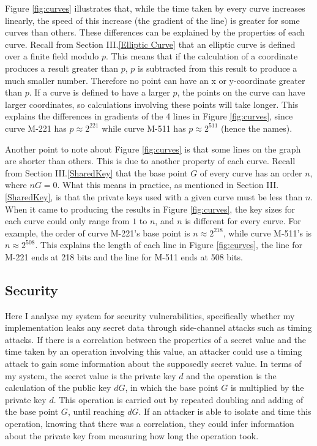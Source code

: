 \documentclass[12pt,a4paper]{article}
\begin{document}
Figure \ref{fig:curves} illustrates that, while the time taken by every curve increases linearly, 
the speed of this increase (the gradient of the line) is greater for some curves than others. 
These differences can be explained by the properties of each curve. 
Recall from Section III.\ref{Elliptic Curve} that an elliptic curve is defined over a finite field modulo $p$. 
This means that if the calculation of a coordinate produces a result greater than $p$, $p$ is subtracted from this result to produce a much smaller number. 
Therefore no point can have an x or y-coordinate greater than $p$. 
If a curve is defined to have a larger $p$, the points on the curve can have larger coordinates, 
so calculations involving these points will take longer. 
This explains the differences in gradients of the 4 lines in Figure \ref{fig:curves}, 
since curve M-221 has $p \approx 2^{221}$ while curve M-511 has $p \approx 2^{511}$ (hence the names). 

Another point to note about Figure \ref{fig:curves} is that some lines on the graph are shorter than others. 
This is due to another property of each curve. 
Recall from Section III.\ref{SharedKey} that the base point $G$ of every curve has an order $n$, where $nG=0$. 
What this means in practice, as mentioned in Section III.\ref{SharedKey}, 
is that the private keys used with a given curve must be less than $n$. 
When it came to producing the results in Figure \ref{fig:curves}, the key sizes for each curve could only range from $1$ to $n$, 
and $n$ is different for every curve. 
For example, the order of curve M-221's base point is $n \approx 2^{218}$, while curve M-511's is $n \approx 2^{508}$. 
This explains the length of each line in Figure \ref{fig:curves}, the line for M-221 ends at 218 bits and the line for M-511 ends at 508 bits. 


\subsection{Security} \noindent \label{Security}
Here I analyse my system for security vulnerabilities, 
specifically whether my implementation leaks any secret data through side-channel attacks such as timing attacks. 
If there is a correlation between the properties of a secret value and the time taken by an operation involving this value, 
an attacker could use a timing attack to gain some information about the supposedly secret value. 
In terms of my system, the secret value is the private key $d$ and the operation is the calculation of the public key $dG$, 
in which the base point $G$ is multiplied by the private key $d$. 
This operation is carried out by repeated doubling and adding of the base point $G$, until reaching $dG$. 
If an attacker is able to isolate and time this operation, knowing that there was a correlation, 
they could infer information about the private key from measuring how long the operation took. 
\end{document}
